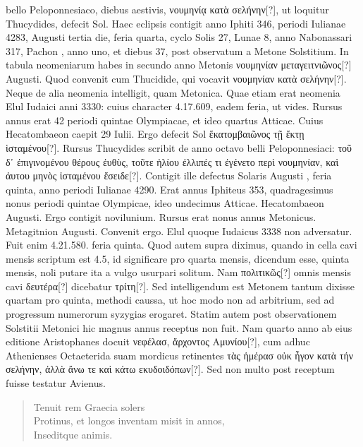 bello Peloponnesiaco, diebus aestivis,
 \textgreek{νουμηνίᾳ κατὰ σελήνην[?]}, ut loquitur
Thucydides, defecit Sol.
Haec eclipsis contigit anno Iphiti 346, periodi
Iulianae 4283, Augusti tertia die, feria quarta, cyclo Solis 27, Lunae
8, anno Nabonassari 317, Pachon , anno uno, et diebus 37, post
observatum a Metone Solstitium.
In tabula neomeniarum habes
in secundo anno Metonis \textgreek{νουμηνίαν μεταγειτνιῶνος[?]}
  Augusti.
Quod
convenit cum Thucidide, qui vocavit \textgreek{νουμηνίαν κατὰ σελήνην[?]}.
Neque
de alia neomenia intelligit, quam Metonica.
Quae etiam erat neomenia
Elul Iudaici anni 3330: cuius character 4.17.609, eadem feria, ut
vides.
Rursus annus erat 42 periodi quintae Olympiacae, et ideo quartus
Atticae.
Cuius Hecatombaeon caepit 29 Iulii.
Ergo defecit Sol \textgreek{ἕκατομβαιῶνος
τῇ ἕκτῃ ἱσταμένου[?]}.
Rursus Thucydides scribit de anno octavo
belli Peloponnesiaci: \textgreek{τοῦ δ᾽ ἐπιγινομένου θέρους ἐυθὺς,
 τοῦτε ἡλίου ἐλλιπές τι
ἐγένετο περὶ νουμηνίαν, καὶ ἀυτου μηνὸς ἱσταμένου ἔσειδε[?]}.
Contigit ille defectus
Solaris Augusti , feria quinta, anno periodi Iulianae 4290.
Erat
annus Iphiteus 353, quadragesimus nonus periodi quintae Olympicae,
ideo undecimus Atticae.
Hecatombaeon  Augusti.
Ergo  contigit
novilunium.
Rursus erat nonus annus Metonicus.
Metagitnion  Augusti.
Convenit ergo.
Elul quoque Iudaicus 3338 non
adversatur.
Fuit enim 4.21.580. feria quinta.
Quod autem supra
diximus, quando in cella cavi mensis scriptum est 4.5, id significare
pro quarta mensis, dicendum esse, quinta mensis, noli putare ita a vulgo
usurpari solitum.
Nam \textgreek{πολιτικῶς[?]} omnis mensis cavi
 \textgreek{δευτέρα[?]} dicebatur
\textgreek{τρίτη[?]}.
Sed intelligendum est Metonem tantum dixisse quartam
pro quinta, methodi caussa, ut hoc modo non ad arbitrium, sed
ad progressum numerorum syzygias erogaret.
%
Statim autem post observationem
Solstitii Metonici hic magnus annus receptus non fuit.
Nam quarto anno ab eius editione Aristophanes docuit
 \textgreek{νεφέλασ, ἄρχοντος
Αμυνίου[?]},
cum adhuc Athenienses Octaeterida suam mordicus
retinentes \textgreek{τὰς ἡμέρασ οὐκ ἦγον κατὰ τήν σελήνην,
 ἀλλὰ ἄνω τε καὶ κάτω εκυδοιδόπων[?]}.
Sed non multo post receptum fuisse testatur Avienus.
\begin{verse}
\emd{} Tenuit rem Graecia solers\\
Protinus, et longos inventam misit in annos,\\
Inseditque animis.
\end{verse}
